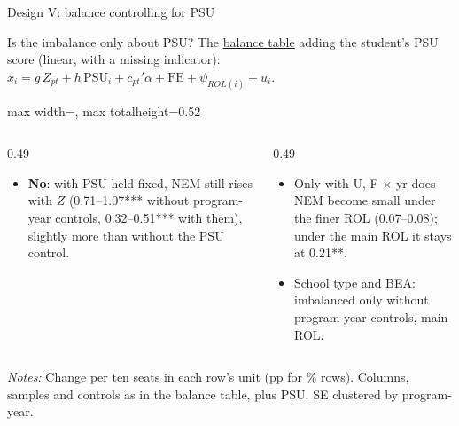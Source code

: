 \documentclass{beamer}
\begin{document}
\begin{frame}[label=d5-balance-psu]{Design V: balance controlling for PSU}
{\scriptsize Is the imbalance only about PSU? The \hyperlink{d5-balance}{\color{blue}balance table} adding the student's PSU score (linear, with a missing indicator): $x_i = g\,Z_{pt} + h\,\text{PSU}_i + c_{pt}'\alpha + \text{FE} + \psi_{ROL(i)} + u_i$.\par}
\vspace{0.02cm}
\centering
\begin{adjustbox}{max width=\textwidth, max totalheight=0.52\textheight}

\end{adjustbox}

\vspace{0.02cm}
\raggedright
\begin{columns}[T,onlytextwidth]
\begin{column}{0.49\textwidth}
\scriptsize
\begin{itemize}
    \setlength{\itemsep}{1pt}
    \item \textbf{No}: with PSU held fixed, NEM still rises with $Z$ (0.71--1.07*** without program-year controls, 0.32--0.51*** with them), slightly more than without the PSU control.
\end{itemize}
\end{column}
\begin{column}{0.49\textwidth}
\scriptsize
\begin{itemize}
    \setlength{\itemsep}{1pt}
    \item Only with U, F $\times$ yr does NEM become small under the finer ROL (0.07--0.08); under the main ROL it stays at 0.21**.
    \item School type and BEA: imbalanced only without program-year controls, main ROL.
\end{itemize}
\end{column}
\end{columns}

\parbox{0.97\textwidth}{\tiny \textit{Notes:} Change per ten seats in each row's unit (pp for \% rows). Columns, samples and controls as in the balance table, plus PSU. SE clustered by program-year.}
\end{frame}
\end{document}
